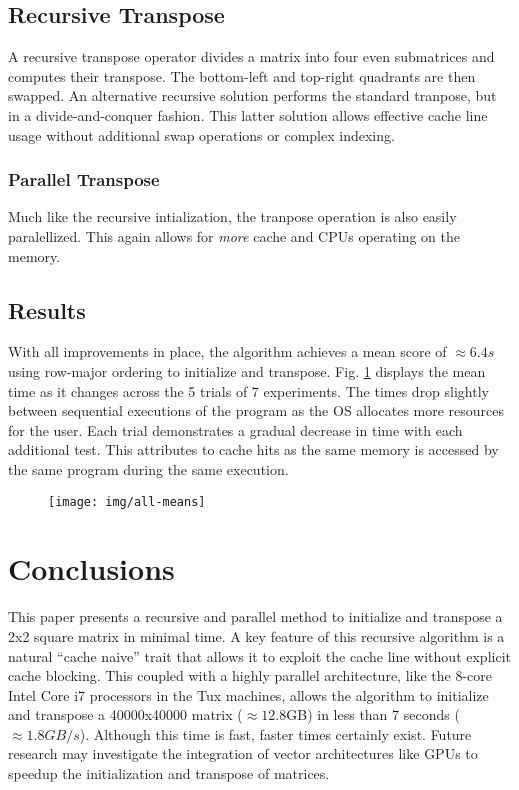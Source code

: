 \documentclass[conference]{IEEEtran}
\begin{document}
\subsection{Recursive Transpose}\label{recursive-transpose}

A recursive transpose operator divides a matrix into four even
submatrices and computes their transpose. The bottom-left and top-right
quadrants are then swapped. An alternative recursive solution performs
the standard tranpose, but in a divide-and-conquer fashion. This latter
solution allows effective cache line usage without additional swap
operations or complex indexing.

\subsubsection{Parallel Transpose}\label{parallel-transpose}

Much like the recursive intialization, the tranpose operation is also
easily paralellized. This again allows for \emph{more} cache and CPUs
operating on the memory.

\subsection{Results}\label{results}

With all improvements in place, the algorithm achieves a mean score of
\(\approx 6.4s\) using row-major ordering to initialize and transpose.
Fig. \ref{all-means} displays the mean time as it changes across the 5
trials of 7 experiments. The times drop slightly between sequential
executions of the program as the OS allocates more resources for the
user. Each trial demonstrates a gradual decrease in time with each
additional test. This attributes to cache hits as the same memory is
accessed by the same program during the same execution.

\begin{figure}[ht]
\centering
\label{all-means}
\texttt{[image: img/all-means]}
\end{figure}

\section{Conclusions}\label{conclusions}

This paper presents a recursive and parallel method to initialize and
transpose a 2x2 square matrix in minimal time. A key feature of this
recursive algorithm is a natural ``cache naive'' trait that allows it to
exploit the cache line without explicit cache blocking. This coupled
with a highly parallel architecture, like the 8-core Intel Core i7
processors in the Tux machines, allows the algorithm to initialize and
transpose a 40000x40000 matrix (\(\approx 12.8\)GB) in less than 7
seconds (\(\approx 1.8GB/s\)). Although this time is fast, faster times
certainly exist. Future research may investigate the integration of
vector architectures like GPUs to speedup the initialization and
transpose of matrices.
\end{document}
